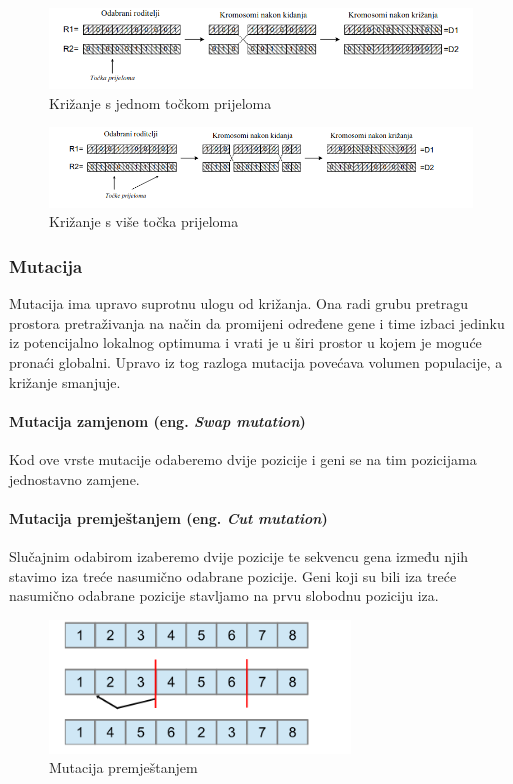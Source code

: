 \documentclass[times, utf8, zavrsni]{fer}
\begin{document}
\begin{figure}[H]
	\centering
	\includegraphics[width=12cm]{slike/crossOnePoint.png}
	\caption{Križanje s jednom točkom prijeloma}
	\label{fig:one-cross}
\end{figure}

\begin{figure}[H]
	\centering
	\includegraphics[width=12cm]{slike/crossTPoint.png}
	\caption{Križanje s više točka prijeloma}
	\label{fig:t-crosses}
\end{figure}

\subsubsection{Mutacija}

Mutacija ima upravo suprotnu ulogu od križanja. Ona radi grubu pretragu prostora pretraživanja na način da promijeni određene gene i time izbaci jedinku iz potencijalno lokalnog optimuma i vrati je u širi prostor u kojem je moguće pronaći globalni. Upravo iz tog razloga mutacija povećava volumen populacije, a križanje smanjuje. 

\paragraph{Mutacija zamjenom (eng. \emph{Swap mutation})}
\label{SwapMutation}
Kod ove vrste mutacije odaberemo dvije pozicije i geni se na tim pozicijama jednostavno zamjene.

\paragraph{Mutacija premještanjem (eng. \emph{Cut mutation})}
Slučajnim odabirom izaberemo dvije pozicije te sekvencu gena između njih stavimo iza treće nasumično odabrane pozicije. Geni koji su bili iza treće nasumično odabrane pozicije stavljamo na prvu slobodnu poziciju iza.

\begin{figure}[!htb]
	\centering
	\includegraphics[width=8cm]{slike/cutMutation.png}
	\caption{Mutacija premještanjem}
	\label{fig:cut-mutation}
\end{figure}
\end{document}
